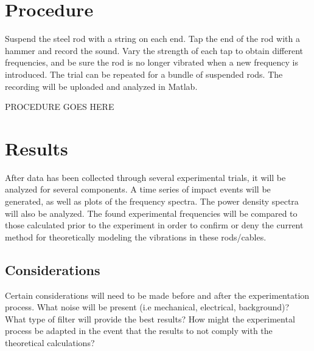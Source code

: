\documentclass[10pt,letterpaper,titlepage]{article}
\begin{document}
\section{Procedure}

Suspend the steel rod with a string on each end. Tap the end of the rod with a hammer and record the sound. Vary the strength of each tap to obtain different frequencies, and be sure the rod is no longer vibrated when a new frequency is introduced. The trial can be repeated for a bundle of suspended rods. The recording will be uploaded and analyzed in Matlab. 

PROCEDURE GOES HERE

\section{Results}

After data has been collected through several experimental trials, it will be analyzed for several components. A time series of impact events will be generated, as well as plots of the frequency spectra. The power density spectra will also be analyzed. The found experimental frequencies will be compared to those calculated prior to the experiment in order to confirm or deny the current method for theoretically modeling the vibrations in these rods/cables. 

\subsection{Considerations}

Certain considerations will need to be made before and after the experimentation process. What noise will be present (i.e mechanical, electrical, background)? What type of filter will provide the best results? How might the experimental process be adapted in the event that the results to not comply with the theoretical calculations?

% 
% 
% 
% 



% 
% 

\end{document}
